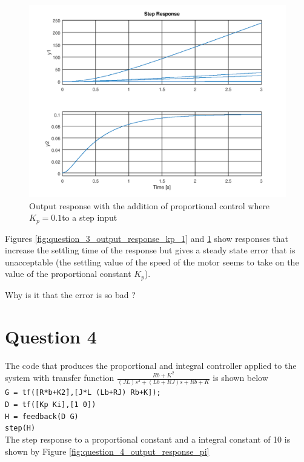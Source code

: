 \documentclass[a4paper, 12pt]{article}
\begin{document}
\begin{figure}[H]
	\centering
	\includegraphics[width=\textwidth]{Images/question_3_output_response_kp_01.png}
	\caption{Output response with the addition of proportional control where $K_p = 0.1$to a step input}
	\label{fig:question_3_output_response_kp_01}
\end{figure}

Figures \ref{fig:question_3_output_response_kp_1} and \ref{fig:question_3_output_response_kp_01} show responses that increase the settling time of the response but gives a steady state error that is unacceptable (the settling value of the speed of the motor seems to take on the value of the proportional constant $K_p$). 

Why is it that the error is so bad ?

\section{Question 4} %
\label{sec:question_4}
The code that produces the proportional and integral controller applied to the system with transfer function $\frac{Rb+K^2}{(JL)s^3+(Lb+RJ)s+Rb+K}$ is shown below \\ 
\noindent
\texttt{G = tf([R*b+K\^2],[J*L (L\*b+R\*J) R\*b+K]);}\\
\texttt{D = tf([Kp Ki],[1 0])}\\
\texttt{H = feedback(D \* G)}\\
\texttt{step(H)}\\

The step response to a proportional constant and a integral constant of 10 is shown by Figure \ref{fig:question_4_output_response_pi}
\end{document}
